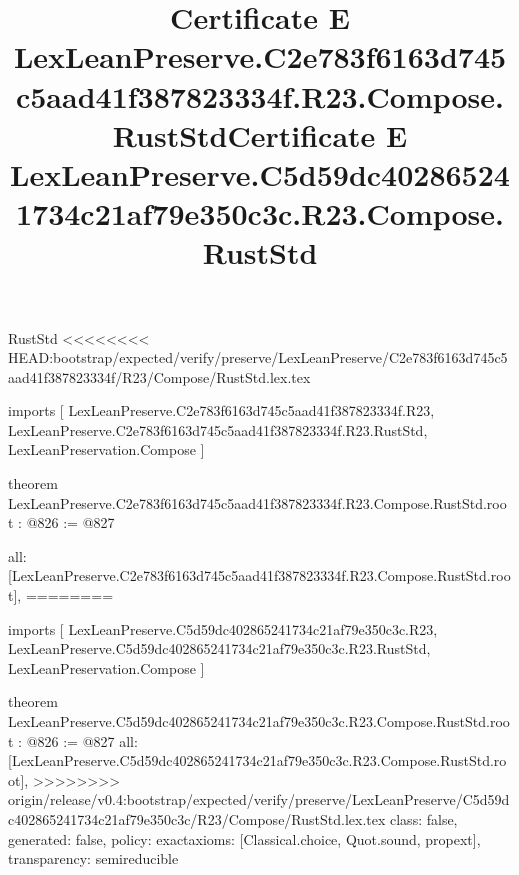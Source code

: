 \begin{lexlean}{RustStd}
<<<<<<<< HEAD:bootstrap/expected/verify/preserve/LexLeanPreserve/C2e783f6163d745c5aad41f387823334f/R23/Compose/RustStd.lex.tex
\title{Certificate E LexLeanPreserve.C2e783f6163d745c5aad41f387823334f.R23.Compose.RustStd}
\begin{coremodule}
imports [
  LexLeanPreserve.C2e783f6163d745c5aad41f387823334f.R23,
  LexLeanPreserve.C2e783f6163d745c5aad41f387823334f.R23.RustStd,
  LexLeanPreservation.Compose
]

theorem LexLeanPreserve.C2e783f6163d745c5aad41f387823334f.R23.Compose.RustStd.root : @826 := @827 {
  all: [LexLeanPreserve.C2e783f6163d745c5aad41f387823334f.R23.Compose.RustStd.root],
========
\title{Certificate E LexLeanPreserve.C5d59dc402865241734c21af79e350c3c.R23.Compose.RustStd}
\begin{coremodule}
imports [
  LexLeanPreserve.C5d59dc402865241734c21af79e350c3c.R23,
  LexLeanPreserve.C5d59dc402865241734c21af79e350c3c.R23.RustStd,
  LexLeanPreservation.Compose
]

theorem LexLeanPreserve.C5d59dc402865241734c21af79e350c3c.R23.Compose.RustStd.root : @826 := @827 {
  all: [LexLeanPreserve.C5d59dc402865241734c21af79e350c3c.R23.Compose.RustStd.root],
>>>>>>>> origin/release/v0.4:bootstrap/expected/verify/preserve/LexLeanPreserve/C5d59dc402865241734c21af79e350c3c/R23/Compose/RustStd.lex.tex
  class: false,
  generated: false,
  policy: exact{axioms: [Classical.choice, Quot.sound, propext]},
  transparency: semireducible
}


\end{coremodule}}
\end{coremodule}
\end{lexlean}
